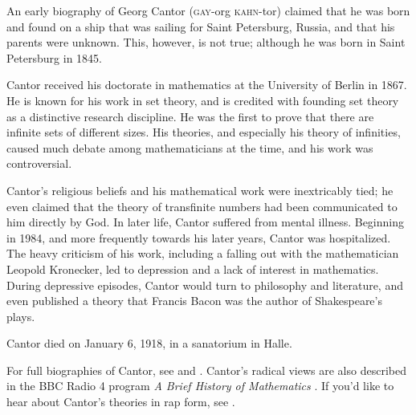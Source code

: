 \documentclass[../../../include/open-logic-section]{subfiles}
\begin{document}



An early biography of Georg Cantor (\textsc{gay}-org
\textsc{kahn}-tor) claimed that he was born and found on a ship that
was sailing for Saint Petersburg, Russia, and that his parents were
unknown. This, however, is not true; although he was born in Saint
Petersburg in 1845.

Cantor received his doctorate in mathematics at the University of Berlin in
1867. He is known for his work in set theory, and is credited with founding
set theory as a distinctive research discipline.
He was the first to prove that there are infinite sets of different sizes.
His theories, and especially his theory of infinities, caused much debate
among mathematicians at the time, and his work was controversial.

Cantor's religious beliefs and his mathematical work were inextricably
tied; he even claimed that the theory of transfinite numbers had been
communicated to him directly by God. In later life, Cantor suffered
from mental illness. Beginning in 1984, and more frequently towards
his later years, Cantor was hospitalized.  The heavy criticism of his
work, including a falling out with the mathematician Leopold
Kronecker, led to depression and a lack of interest in
mathematics. During depressive episodes, Cantor would turn to
philosophy and literature, and even published a theory that Francis Bacon
was the author of Shakespeare's plays.

Cantor died on January 6, 1918, in a sanatorium in Halle.

\begin{reading} 
For full biographies of Cantor, see \citet{Dauben1990} and
\citet{Grattan-Guinness1971}.  Cantor's radical views are also
described in the BBC Radio 4 program \emph{A Brief History of
  Mathematics} \citep{Sautoy2014}.  If you'd like to hear about
Cantor's theories in rap form, see \citet{Rose2012}.
\end{reading}
\end{document}
